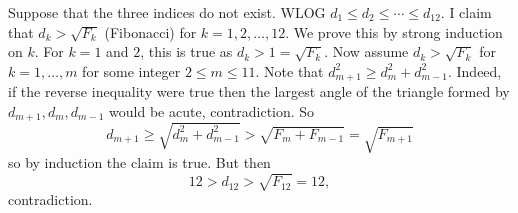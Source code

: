 Suppose that the three indices do not exist. WLOG $d_1\leq d_2\leq\cdots\leq d_{12}$. I claim that $d_k>\sqrt{F_k}$ (Fibonacci) for $k=1,2,\ldots,12$. We prove this by strong induction on $k$. For $k=1$ and $2$, this is true as $d_k>1=\sqrt{F_k}$. Now assume $d_k>\sqrt{F_k}$ for $k=1,\ldots,m$ for some integer $2\leq m\leq11$. Note that $d_{m+1}^2\geq d_m^2+d_{m-1}^2$. Indeed, if the reverse inequality were true then the largest angle of the triangle formed by $d_{m+1},d_m,d_{m-1}$ would be acute, contradiction. So
\[
	d_{m+1}\geq\sqrt{d_m^2+d_{m-1}^2}>\sqrt{F_m+F_{m-1}}=\sqrt{F_{m+1}}
\]
so by induction the claim is true. But then
\[
	12>d_{12}>\sqrt{F_{12}}=12,
\]
contradiction.